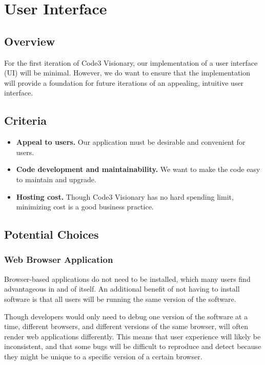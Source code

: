 \documentclass[onecolumn, draftclsnofoot,10pt, compsoc]{IEEEtran}
\begin{document}
\section{User Interface}
\subsection{Overview}
For the first iteration of Code3 Visionary, our implementation of a user interface (UI) will be minimal. 
However, we do want to ensure that the implementation will provide a foundation for future iterations of an appealing, intuitive user interface.

\subsection{Criteria}

\begin{itemize}
    \item \textbf{Appeal to users.} 
    Our application must be desirable and convenient for users.
    \item \textbf{Code development and maintainability.}
    We want to make the code easy to maintain and upgrade.
    \item \textbf{Hosting cost.} Though Code3 Visionary has no hard spending limit, minimizing cost is a good business practice. 
\end{itemize}

    \subsection{Potential Choices}
    
        \subsubsection{Web Browser Application}
        Browser-based applications do not need to be installed, which many users find advantageous in and of itself. 
        An additional benefit of not having to install software is that all users will be running the same version of the software.
        
        Though developers would only need to debug one version of the software at a time, different browsers, and different versions of the same browser, will often render web applications differently.
        This means that user experience will likely be inconsistent, and that some bugs will be difficult to reproduce and detect because they might be unique to a specific version of a certain browser.
        
\end{document}
